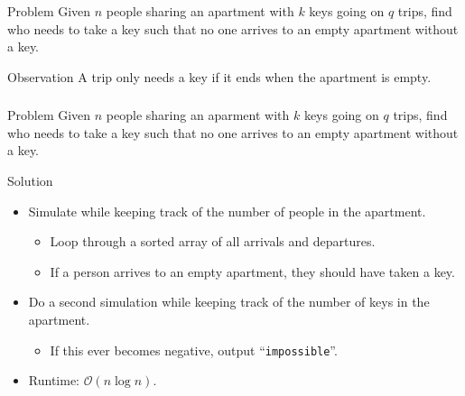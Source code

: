 \begin{frame}
    \frametitle{\problemtitle}
    \begin{block}{Problem}
    	Given $n$ people sharing an apartment with $k$ keys going on $q$ trips, find who needs to take a key such that no one arrives to an empty apartment without a key.
    \end{block}
    \pause
    \begin{block}{Observation}
        A trip only needs a key if it ends when the apartment is empty.
    \end{block}
\end{frame}

\begin{frame}
	\frametitle{\problemtitle}
	\begin{block}{Problem}
    	Given $n$ people sharing an aparment with $k$ keys going on $q$ trips, find who needs to take a key such that no one arrives to an empty apartment without a key.
    \end{block}
    \begin{block}{Solution}
    	\begin{itemize}
        \item Simulate while keeping track of the number of people in the apartment.
        	\begin{itemize}
        	\item Loop through a sorted array of all arrivals and departures.
        	\item If a person arrives to an empty apartment, they should have taken a key. \pause
        	\end{itemize}
        \item Do a second simulation while keeping track of the number of keys in the apartment.
        	\begin{itemize}
        	\item If this ever becomes negative, output ``\texttt{impossible}''. \pause
        	\end{itemize}
        \item Runtime: $\mathcal{O}(n \log n)$.
        \end{itemize}
    \end{block}
    \pause
    \solvestats
\end{frame}
